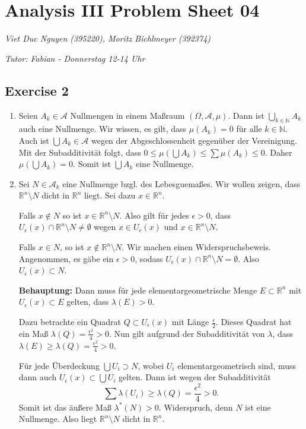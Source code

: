 \documentclass[a4paper]{article}
\begin{document}
\section*{Analysis III Problem Sheet 04}
\textit{Viet Duc Nguyen (395220), Moritz Bichlmeyer (392374)}

\noindent\textit{Tutor: Fabian - Donnerstag 12-14 Uhr}


\subsection*{Exercise 2}
\begin{enumerate}[label=(\roman*)]
	\item Seien $A_k \in \mathcal A$ Nullmengen in einem Maßraum $(\Omega, \mathcal A, \mu)$. Dann ist $\bigcup_{k \in \mathbb N} A_k$ auch eine Nullmenge. Wir wissen, es gilt, dass $\mu(A_k) = 0$ für alle $k \in \mathbb N$. Auch ist $\bigcup A_k \in \mathcal A$ wegen der Abgeschlossenheit gegenüber der Vereinigung. Mit der Subadditivität folgt, dass $0 \leq \mu(\bigcup A_k) \leq \sum \mu(A_k) \leq 0$. Daher $\mu(\bigcup A_k) = 0$. Somit ist $\bigcup A_k$ eine Nullmenge.
	
	\item Sei $N \in \mathcal A_k$ eine Nullmenge bzgl. des Lebesguemaßes. Wir wollen zeigen, dass $\mathbb R^n \setminus N$ dicht in $\mathbb R^n$ liegt. Sei dazu $x \in \mathbb R^n$. 
	
	Falls $x \notin N$ so ist $x \in \mathbb R^n \setminus N$. Also gilt für jedes $\epsilon > 0$, dass $U_{\epsilon}(x) \cap \mathbb R^n \setminus N \neq \emptyset$ wegen $x \in U_{\epsilon}(x)$ und $x \in \mathbb R^n \setminus N$.
	
	Falls $x \in N$, so ist $x \notin \mathbb R^n \setminus N$. Wir machen einen Widerspruchsbeweis. Angenommen, es gäbe ein $\epsilon > 0$, sodass $U_{\epsilon}(x) \cap \mathbb R^n \setminus N = \emptyset$. Also $U_\epsilon(x) \subset N$.
	
	 \textbf{Behauptung:} Dann muss für jede elementargeometrische Menge $E \subset \mathbb R^n$ mit $U_{\epsilon}(x)  \subset E$ gelten, dass $\lambda(E) > 0$. 
	 
	 Dazu betrachte ein Quadrat $Q \subset U_{\epsilon}(x)$ mit Länge $\frac{\epsilon}{2}$. Dieses Quadrat hat ein Maß $\lambda(Q) = \frac{\epsilon^2}{4} > 0$. Nun gilt aufgrund der Subadditivität von $\lambda$, dass $\lambda(E) \geq \lambda(Q) = \frac{\epsilon^2}{4} > 0$. 
	 
	 Für jede Überdeckung $\bigcup U_i \supset N$, wobei $U_i$ elementargeometrisch sind, muss dann auch $U_\epsilon(x) \subset \bigcup U_i$ gelten. Dann ist wegen der Subadditivität $$\sum \lambda(U_i) \geq \lambda(Q) = \frac{\epsilon^2}{4} > 0.$$ Somit ist das äußere Maß $\lambda^*(N) > 0$. Widerspruch, denn $N$ ist eine Nullmenge. Also liegt $\mathbb R^n \setminus N$ dicht in $\mathbb R^n$.
	 

\end{enumerate}
\end{document}
